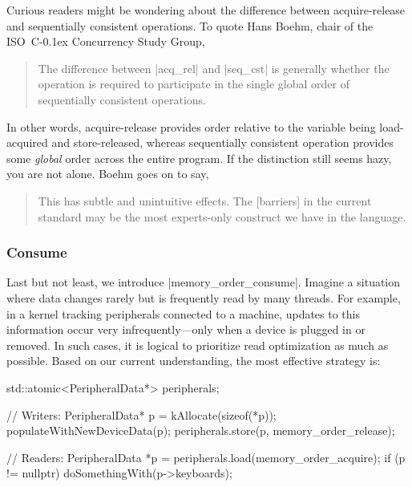 \documentclass[fontsize=10pt, oneside]{scrartcl}
\newcommand{\cplusplus}[1]{C\kern-0.1ex\raisebox{0.15ex}{\texttt{++}}}
\begin{document}
Curious readers might be wondering about the difference between acquire-release and sequentially consistent operations.
To quote Hans Boehm, chair of the ISO~\cplusplus{} Concurrency Study Group,
\begin{quote}
\small
The difference between \cc|acq_rel| and \cc|seq_cst| is generally whether the operation is required to participate in the single global order of sequentially consistent operations.
\end{quote}
In other words, acquire-release provides order relative to the variable being load-acquired and store-released,
whereas sequentially consistent operation provides some \emph{global} order across the entire program.
If the distinction still seems hazy, you are not alone.
Boehm goes on to say,
\begin{quote}
\small
This has subtle and unintuitive effects.
The [barriers] in the current standard may be the most
experts-only construct we have in the language.
\end{quote}

\subsubsection{Consume}

Last but not least, we introduce \cc|memory_order_consume|.
Imagine a situation where data changes rarely but is frequently read by many threads.
For example, in a kernel tracking peripherals connected to a machine,
updates to this information occur very infrequently—only when a device is plugged in or removed.
In such cases, it is logical to prioritize read optimization as much as possible.
Based on our current understanding, the most effective strategy is:
\begin{cppcode}
std::atomic<PeripheralData*> peripherals;

// Writers:
PeripheralData* p = kAllocate(sizeof(*p));
populateWithNewDeviceData(p);
peripherals.store(p, memory_order_release);
\end{cppcode}
\begin{cppcode}
// Readers:
PeripheralData *p = peripherals.load(memory_order_acquire);
if (p != nullptr) {
    doSomethingWith(p->keyboards);
}
\end{cppcode}
\end{document}
